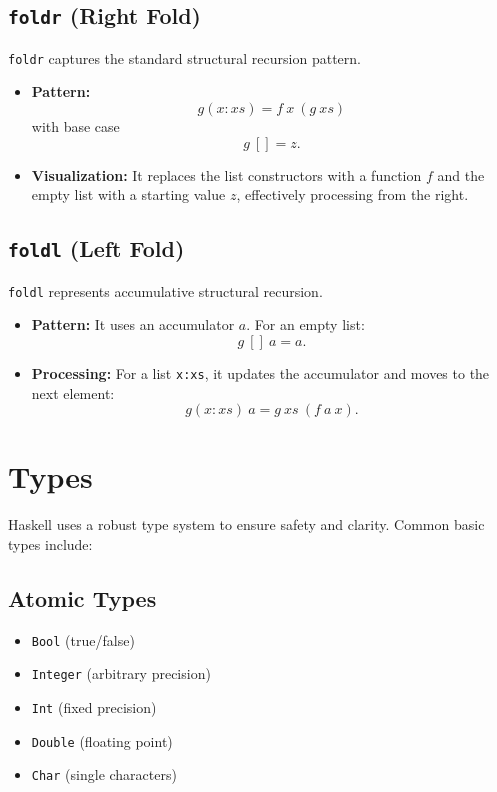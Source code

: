 \documentclass[12pt]{article}
\begin{document}
\subsection{\texttt{foldr} (Right Fold)}

\texttt{foldr} captures the standard structural recursion pattern.

\begin{itemize}
  \item \textbf{Pattern:}
        \[
          g(x:xs) = f \ x \ (g \ xs)
        \]
        with base case
        \[
          g \ [] = z.
        \]
  \item \textbf{Visualization:} It replaces the list constructors with a function $f$ and the empty list with a starting value $z$, effectively processing from the right.
\end{itemize}

\subsection{\texttt{foldl} (Left Fold)}

\texttt{foldl} represents accumulative structural recursion.

\begin{itemize}
  \item \textbf{Pattern:} It uses an accumulator $a$. For an empty list:
        \[
          g \ [] \ a = a.
        \]
  \item \textbf{Processing:} For a list \texttt{x:xs}, it updates the accumulator and moves to the next element:
        \[
          g(x:xs) \ a = g \ xs \ (f \ a \ x).
        \]
\end{itemize}

\section{Types}

Haskell uses a robust type system to ensure safety and clarity. Common basic types include:

\subsection{Atomic Types}
\begin{itemize}
  \item \texttt{Bool} (true/false)
  \item \texttt{Integer} (arbitrary precision)
  \item \texttt{Int} (fixed precision)
  \item \texttt{Double} (floating point)
  \item \texttt{Char} (single characters)
\end{itemize}
\end{document}
